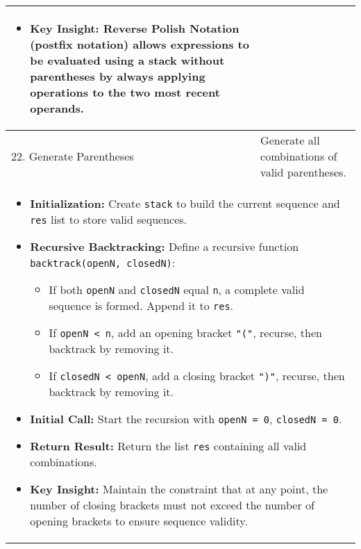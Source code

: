 \begin{summary}
\begin{center}
\begin{tabular}{ll}
{\begin{itemize}
                    \item \textbf{Key Insight:} Reverse Polish Notation (postfix notation) allows expressions to be evaluated using a stack without parentheses by always applying operations to the two most recent operands.
                \end{itemize}                              
            } \\
            \midrule
            22. Generate Parentheses & Generate all combinations of valid parentheses. \\
            \multicolumn{2}{p{\linewidth}}{
                \begin{itemize}
                    \item \textbf{Initialization:} Create \texttt{stack} to build the current sequence and \texttt{res} list to store valid sequences.
                
                    \item \textbf{Recursive Backtracking:} Define a recursive function \texttt{backtrack(openN, closedN)}:
                    \begin{itemize}
                        \item If both \texttt{openN} and \texttt{closedN} equal \texttt{n}, a complete valid sequence is formed. Append it to \texttt{res}.
                        \item If \texttt{openN < n}, add an opening bracket \texttt{"("}, recurse, then backtrack by removing it.
                        \item If \texttt{closedN < openN}, add a closing bracket \texttt{")"}, recurse, then backtrack by removing it.
                    \end{itemize}
                
                    \item \textbf{Initial Call:} Start the recursion with \texttt{openN = 0}, \texttt{closedN = 0}.
                
                    \item \textbf{Return Result:} Return the list \texttt{res} containing all valid combinations.
                
                    \item \textbf{Key Insight:} Maintain the constraint that at any point, the number of closing brackets must not exceed the number of opening brackets to ensure sequence validity.
                \end{itemize}
            } \\
            \bottomrule
        \end{tabular}
    \end{center}
\end{summary}
\newpage

